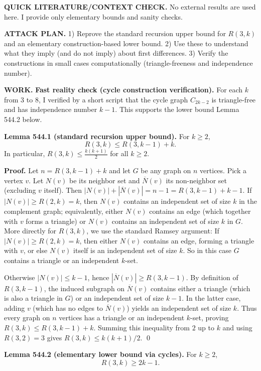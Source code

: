 \noindent\textbf{QUICK LITERATURE/CONTEXT CHECK.}
No external results are used here. I provide only elementary bounds and sanity checks.

\noindent\textbf{ATTACK PLAN.}
1) Reprove the standard recursion upper bound for $R(3,k)$ and an elementary construction-based lower bound.
2) Use these to understand what they imply (and do not imply) about first differences.
3) Verify the constructions in small cases computationally (triangle-freeness and independence number).

\noindent\textbf{WORK.}
\textbf{Fast reality check (cycle construction verification).}
For each $k$ from $3$ to $8$, I verified by a short script that the cycle graph $C_{2k-2}$ is triangle-free and has independence number $k-1$.
This supports the lower bound Lemma 544.2 below.

\medskip
\textbf{Lemma 544.1 (standard recursion upper bound).}
For $k\ge 2$,
\[
R(3,k)\le R(3,k-1)+k.
\]
In particular, $R(3,k)\le \frac{k(k+1)}{2}$ for all $k\ge 2$.

\textbf{Proof.}
Let $n=R(3,k-1)+k$ and let $G$ be any graph on $n$ vertices.
Pick a vertex $v$.
Let $N(v)$ be its neighbor set and $\overline N(v)$ its non-neighbor set (excluding $v$ itself).
Then $|N(v)|+|\overline N(v)|=n-1=R(3,k-1)+k-1$.
If $|N(v)|\ge R(2,k)=k$, then $N(v)$ contains an independent set of size $k$ in the complement graph; equivalently, either $N(v)$ contains an edge (which together with $v$ forms a triangle) or $N(v)$ contains an independent set of size $k$ in $G$.
More directly for $R(3,k)$, we use the standard Ramsey argument:
If $|N(v)|\ge R(2,k)=k$, then either $N(v)$ contains an edge, forming a triangle with $v$, or else $N(v)$ itself is an independent set of size $k$.
So in this case $G$ contains a triangle or an independent $k$-set.

Otherwise $|N(v)|\le k-1$, hence $|\overline N(v)|\ge R(3,k-1)$.
By definition of $R(3,k-1)$, the induced subgraph on $\overline N(v)$ contains either a triangle (which is also a triangle in $G$) or an independent set of size $k-1$.
In the latter case, adding $v$ (which has no edges to $\overline N(v)$) yields an independent set of size $k$.
Thus every graph on $n$ vertices has a triangle or an independent $k$-set, proving $R(3,k)\le R(3,k-1)+k$.
Summing this inequality from $2$ up to $k$ and using $R(3,2)=3$ gives $R(3,k)\le k(k+1)/2$. \qed

\medskip
\textbf{Lemma 544.2 (elementary lower bound via cycles).}
For $k\ge 2$,
\[
R(3,k)\ge 2k-1.
\]

